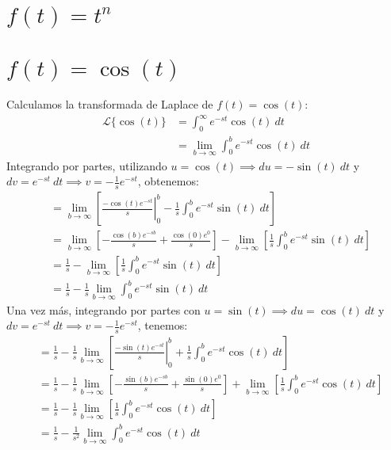 \documentclass[12pt, a4paper]{article}
\begin{document}
\section{\texorpdfstring{\(f(t)=t^n \)}{f (t) = t n}}

\setcounter{section}{7}
\section{\texorpdfstring{\(f(t)=\cos(t)\)}{f (t) = cos (t)}}

Calculamos la transformada de Laplace de \(f(t) = \cos(t)\):
\begin{align*}
	\mathcal{L}\{\cos (t)\} &= \int_{0}^{\infty} e^{-st} \cos(t)\ dt \\
	&= \lim_{b \to \infty} \int_{0}^{b} e^{-st} \cos(t)\ dt
\end{align*}
Integrando por partes, utilizando \(u = \cos(t) \implies du = -\sin(t)\ dt\) y \(dv = e^{-st}\ dt \implies v = -\frac{1}{s} e^{-st}\), obtenemos:
\begin{align*}
	&= \lim_{b \to \infty} \left[ \left. \frac{-\cos (t) e^{-st}}{s} \right|_{0}^{b} - \frac{1}{s} \int_{0}^{b} e^{-st} \sin (t) \ dt \right] \\
	&= \lim_{b \to \infty} \left[ - \frac{\cos (b) e^{-sb}}{s} + \frac{\cos (0) e^{0}}{s} \right] - \lim_{b \to \infty} \left[ \frac{1}{s} \int_{0}^{b} e^{-st} \sin (t) \ dt \right] \\
	&= \frac{1}{s} - \lim_{b \to \infty} \left[ \frac{1}{s} \int_{0}^{b} e^{-st} \sin (t) \ dt \right] \\
	&= \frac{1}{s} - \frac{1}{s} \lim_{b \to \infty} \int_{0}^{b} e^{-st} \sin (t) \ dt
\end{align*}
Una vez más, integrando por partes con \(u = \sin (t) \implies du = \cos (t)\ dt\) y \(dv = e^{-st}\ dt \implies v = -\frac{1}{s} e^{-st}\), tenemos:
\begin{align*}
	&= \frac{1}{s} - \frac{1}{s} \lim_{b \to \infty} \left[ \left. \frac{-\sin (t) e^{-st}}{s} \right|_{0}^{b} + \frac{1}{s} \int_{0}^{b} e^{-st} \cos (t)\ dt \right] \\
	&= \frac{1}{s} - \frac{1}{s} \lim_{b \to \infty} \left[ - \frac{\sin (b) e^{-sb}}{s} + \frac{\sin (0) e^{0}}{s} \right] + \lim_{b \to \infty} \left[ \frac{1}{s} \int_{0}^{b} e^{-st} \cos (t)\ dt \right] \\
	&= \frac{1}{s} - \frac{1}{s} \lim_{b \to \infty} \left[ \frac{1}{s} \int_{0}^{b} e^{-st} \cos (t)\ dt \right] \\
	&= \frac{1}{s} - \frac{1}{s^{2}} \lim_{b \to \infty} \int_{0}^{b} e^{-st} \cos (t) \ dt
\end{align*}
\end{document}
